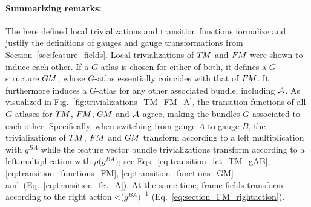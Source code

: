 \paragraph{Summarizing remarks:}

The here defined local trivializations and transition functions formalize and justify the definitions of gauges and gauge transformations from Section~\ref{sec:feature_fields}.
Local trivializations of $T\mkern-1.5muM$ and $F\mkern-1.5muM$ were shown to induce each other.
If a $G$-atlas is chosen for either of both, it defines a $G$-structure $G\mkern-1.4muM$, whose $G$-atlas essentially coincides with that of $F\mkern-1.5muM$.
It furthermore induces a $G$-atlas for any other associated bundle, including $\mathcal{A}$.
As visualized in Fig.~\ref{fig:trivializations_TM_FM_A}, the transition functions of all $G$-atlases for $T\mkern-1.5muM$, $F\mkern-1.5muM$, $G\mkern-1.4muM$ and $\mathcal{A}$ agree, making the bundles $G$-associated to each other.
Specifically, when switching from gauge $A$ to gauge $B$, the trivializations of $T\mkern-1.5muM$, $F\mkern-1.5muM$ and $G\mkern-1.4muM$ transform according to a left multiplication with $g^{BA}$ while the feature vector bundle trivializations transform according to a left multiplication with $\rho\big(g^{BA}\big)$; see Eqs.~\eqref{eq:transition_fct_TM_gAB}, \eqref{eq:transition_functions_FM}, \eqref{eq:transition_functions_GM} and~(Eq.~\eqref{eq:transition_fct_A}).
At the same time, frame fields transform according to the right action $\lhd \big( g^{BA} \big)^{-1}$ (Eq.~\eqref{eq:section_FM_rightaction}).
